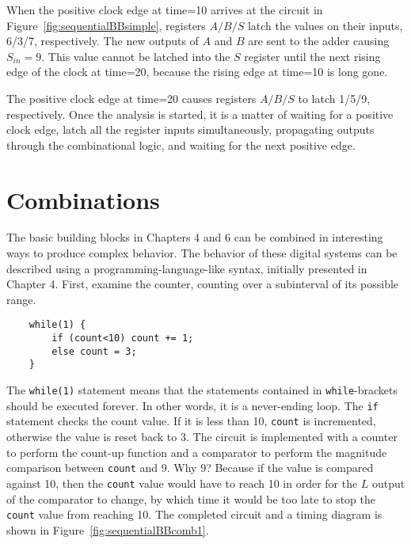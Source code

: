 When the positive clock edge at time=10 arrives at the circuit in 
Figure~\ref{fig:sequentialBBsimple}, registers $A/B/S$ latch the values on their 
inputs, 6/3/7, respectively.  The new outputs of $A$ and $B$ are 
sent to the adder causing $S_{in} = 9$.  This value cannot be 
latched into the $S$ register until the next rising edge of the 
clock at time=20, because the rising edge at time=10 is long gone.

The positive clock edge at time=20 causes registers $A/B/S$ to latch 1/5/9, 
respectively.  Once the analysis is started, it is a matter of waiting for a 
positive clock edge, latch all the register inputs simultaneously, propagating 
outputs through the combinational logic, and waiting for the next positive edge.
                                                                                


\section{Combinations}
The basic building blocks in Chapters 4 and 6 can be combined in interesting ways
to produce complex behavior.  The behavior of these digital systems can be described 
using a programming-language-like syntax, initially presented in Chapter 4. First, examine
the counter, counting over a subinterval of its possible range.

\begin{verbatim}
    while(1) {
        if (count<10) count += 1;
        else count = 3;
    }
\end{verbatim}

The \verb+while(1)+ statement means that the statements contained 
in \verb+while+-brackets should be executed forever.  In other 
words, it is a never-ending loop.  The \verb+if+ statement checks 
the count value. If it is less than 10, \verb+count+ is incremented, 
otherwise the value is reset back to 3. The circuit is implemented 
with a counter to perform the count-up function and a comparator 
to perform the magnitude comparison between \verb+count+ and 9.  
Why 9?  Because if the value is compared against 10, then the 
\verb+count+ value would have to reach 10 in order for the $L$ 
output of the comparator to change, by which time it would be too 
late to stop the \verb+count+ value from reaching 10.  The completed 
circuit and a timing diagram is shown in Figure~\ref{fig:sequentialBBcomb1}.

